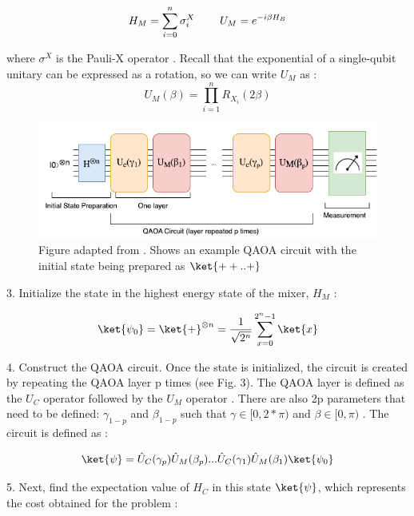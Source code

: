 \begin{equation} 
        H_M =  \sum_{i=0}^{n} \sigma_i^X   \hspace{+8mm}
        U_M = e^{-i \beta H_B}
    \end{equation}

where $\sigma^X$ is the Pauli-X operator \cite{farhiQAOA}. Recall that the exponential of a single-qubit unitary can be expressed as a rotation, so we can write $U_M$ as \cite{classBook}: 
\begin{equation} 
    U_M(\beta) = \prod_{i=1}^{n} R_{X_i}(2 \beta) 
\end{equation}

\begin{figure}[ht]
    \centering
    \includegraphics[width=0.75\linewidth]{images/QAOACircuit.drawio.png}
    \caption{Figure adapted from \cite{review2024}. Shows an example QAOA circuit with the initial state being prepared as $\ket{++..+}$}
    \label{fig:Figure 3}
\end{figure}

3. Initialize the state in the highest energy state of the mixer, $H_M$ \cite{review2024}:

\begin{equation} 
    \ket{\psi_0} = \ket{+}^{\otimes n} = \frac{1}{\sqrt{2^n}} \sum_{x=0}^{2^n -1} \ket{x}
\end{equation}

4. Construct the QAOA circuit. Once the state is initialized, the circuit is created by repeating the QAOA layer p times \cite{farhiQAOA} (see Fig. 3). The QAOA layer is defined as the $U_C$ operator followed by the $U_M$ operator \cite{farhiQAOA}. There are also 2p parameters that need to be defined: $\gamma_{1-p}$ and $\beta_{1-p}$ such that $\gamma \in [0,2*\pi)$ and $\beta \in [0,\pi)$ \cite{review2024}. The circuit is defined as \cite{farhiQAOA}:

\begin{equation} 
    \ket{\psi} = \hat{U}_C(\gamma_p) \hat{U}_M(\beta_p) ... \hat{U}_C(\gamma_1) \hat{U}_M(\beta_1)\ket{\psi_0}
\end{equation}

5. Next, find the expectation value of $H_C$ in this state $\ket{\psi}$, which represents the cost obtained for the problem \cite{qaoaNearTerm}:

